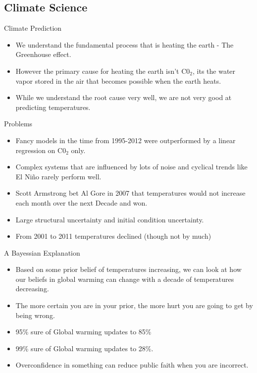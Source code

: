 \documentclass[bigger]{beamer}
\begin{document}
\subsection{Climate Science}
\label{sec-5-1}

\begin{frame}[label=sec-5-1-1]{Climate Prediction}
\begin{itemize}
\item We understand the fundamental process that is heating the earth - The Greenhouse effect.
\item However the primary cause for heating the earth isn't C0$_{\text{2}}$, its the
water vapor stored in the air that becomes possible when the earth
heats.
\item While we understand the root cause very well, we are not very good
at predicting temperatures.
\end{itemize}
\end{frame}

\begin{frame}[label=sec-5-1-2]{Problems}
\begin{itemize}
\item Fancy models in the time from 1995-2012 were outperformed by a
linear regression on C0$_{\text{2}}$ only.
\item Complex systems that are influenced by lots of noise and cyclical
trends like El Niño rarely perform well.
\item Scott Armstrong bet Al Gore in 2007 that temperatures would not
increase each month over the next Decade and won.
\item Large structural uncertainty and initial condition uncertainty.
\item From 2001 to 2011 temperatures declined (though not by much)
\end{itemize}
\end{frame}

\begin{frame}[label=sec-5-1-3]{A Bayessian Explanation}
\begin{itemize}
\item Based on some prior belief of temperatures increasing, we can look
at how our beliefs in global warming can change with a decade of
temperatures decreasing.
\item The more certain you are in your prior, the more hurt you are
going to get by being wrong.
\item 95\% sure of Global warming updates to 85\%
\item 99\% sure of Global warming updates to 28\%.
\item Overconfidence in something can reduce public faith when you are
incorrect.
\end{itemize}
\end{frame}
\end{document}

